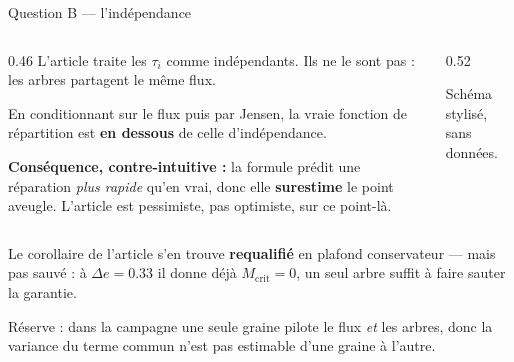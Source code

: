 \documentclass[aspectratio=169,11pt]{beamer}
\begin{document}
\begin{frame}{\hfill Question B --- l'indépendance}
  \begin{columns}[c]
    \begin{column}{0.46\textwidth}
      \small
      L'article traite les $\tau_i$ comme indépendants. Ils ne le sont pas :
      les arbres partagent le même flux.

      \vspace{0.5em}
      En conditionnant sur le flux puis par Jensen, la vraie fonction de
      répartition est \textbf{en dessous} de celle d'indépendance.

      \vspace{0.5em}
      \textbf{Conséquence, contre-intuitive :} la formule prédit une réparation
      \emph{plus rapide} qu'en vrai, donc elle \textbf{surestime} le point aveugle.
      L'article est pessimiste, pas optimiste, sur ce point-là.
    \end{column}
    \begin{column}{0.52\textwidth}
      \begin{center}
        \schemaCDF
      \end{center}
      \vspace{-0.4em}
      \begin{center}\tiny\color{gray}Schéma stylisé, sans données.\end{center}
    \end{column}
  \end{columns}

  \vspace{0.3em}
  \small
  Le corollaire de l'article s'en trouve \textbf{requalifié} en plafond
  conservateur --- mais pas sauvé : à $\Delta e = \num{0.33}$ il donne déjà
  $M_{\mathrm{crit}} = 0$, un seul arbre suffit à faire sauter la garantie.

  \vspace{0.2em}
  {\footnotesize\color{gray}Réserve : dans la campagne une seule graine pilote
  le flux \emph{et} les arbres, donc la variance du terme commun n'est pas
  estimable d'une graine à l'autre.}
\end{frame}
\end{document}
